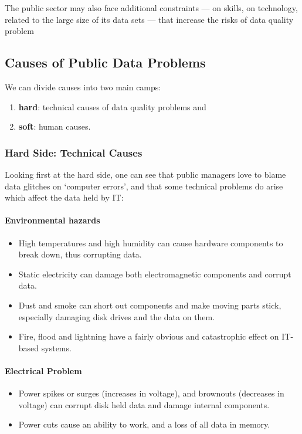 The public sector may also face additional constraints — on skills, on technology, related to the large size of its data sets — that increase the risks of data quality problem

\subsection{Causes of Public Data Problems}
We can divide causes into two main camps: 
\begin{enumerate}
	\item \textbf{hard}: technical causes of data quality problems and 
	\item \textbf{soft}: human causes. 
\end{enumerate}


\subsubsection[Technical Causes]{Hard Side: Technical Causes}
Looking first at the hard side, one can see that public managers love to blame data glitches on `computer errors', and that some technical problems do arise
which affect the data held by IT:


\paragraph*{Environmental hazards}
\begin{itemize}
	\item High temperatures and high humidity can cause hardware components to break down, thus corrupting data. 
	\item Static electricity can damage both electromagnetic components and corrupt data.
	\item Dust and smoke can short out components and make moving parts stick, especially damaging disk drives and the data on them. 
	\item Fire,	flood and lightning have a fairly obvious and catastrophic effect on IT-based systems.
\end{itemize}

\paragraph*{Electrical Problem}
\begin{itemize}
	\item Power spikes or surges (increases in voltage), and brownouts (decreases in voltage) can corrupt disk	held data and damage internal components. 
	\item Power cuts cause an ability to work, and a loss of all data in memory.
\end{itemize}


